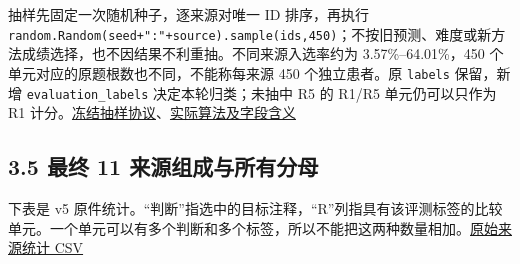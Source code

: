 \documentclass[
  11pt,
  a4paper,
]{article}
\begin{document}
抽样先固定一次随机种子，逐来源对唯一 ID 排序，再执行
\texttt{random.\allowbreak{}Random(seed+":\allowbreak{}"+source).\allowbreak{}sample(ids,450)}；不按旧预测、难度或新方法成绩选择，也不因结果不利重抽。不同来源入选率约为
3.57\%--64.01\%，450 个单元对应的原题根数也不同，不能称每来源 450
个独立患者。原 \texttt{labels} 保留，新增
\texttt{evaluation\_\allowbreak{}labels} 决定本轮归类；未抽中 R5 的
R1/R5 单元仍可以只作为 R1
计分。\href{https://github.com/xiotakut/cf_mrg/blob/main/papers/2026-10-02_cf_moa/author_dossier/sources/3475b2dfd66b_sampling_protocol.json}{冻结抽样协议}、\href{https://github.com/xiotakut/cf_mrg/blob/main/papers/2026-10-02_cf_moa/author_dossier/records/data/construction.md\#L2467}{实际算法及字段含义}

\subsection{3.5 最终 11
来源组成与所有分母}\label{ux6700ux7ec8-11-ux6765ux6e90ux7ec4ux6210ux4e0eux6240ux6709ux5206ux6bcd}

下表是 v5
原件统计。``判断''指选中的目标注释，``R''列指具有该评测标签的比较单元。一个单元可以有多个判断和多个标签，所以不能把这两种数量相加。\href{https://github.com/xiotakut/cf_mrg/blob/main/papers/2026-10-02_cf_moa/author_dossier/sources/6a95155c789d_source_summary.csv}{原始来源统计
CSV}
\end{document}
